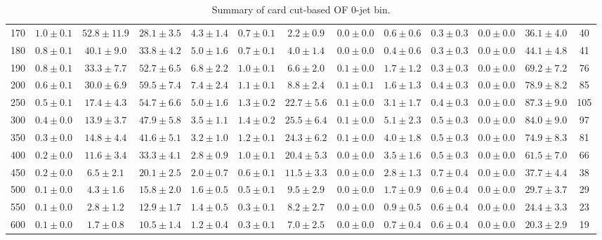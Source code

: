 \begin{table}
{\begin{center}
\begin{tabular}{l | c c | c c c c c c c c  | c c}
170 & $1.0\pm0.1$ & $52.8\pm11.9$ & $28.1\pm3.5$ & $4.3\pm1.4$ & $0.7\pm0.1$ & $2.2\pm0.9$ & $0.0\pm0.0$ & $0.6\pm0.6$ & $0.3\pm0.3$ & $0.0\pm0.0$ & $36.1\pm4.0$ & 40 \\
180 & $0.8\pm0.1$ & $40.1\pm9.0$ & $33.8\pm4.2$ & $5.0\pm1.6$ & $0.7\pm0.1$ & $4.0\pm1.4$ & $0.0\pm0.0$ & $0.4\pm0.6$ & $0.3\pm0.3$ & $0.0\pm0.0$ & $44.1\pm4.8$ & 41 \\
190 & $0.8\pm0.1$ & $33.3\pm7.7$ & $52.7\pm6.5$ & $6.8\pm2.2$ & $1.0\pm0.1$ & $6.6\pm2.0$ & $0.1\pm0.0$ & $1.7\pm1.2$ & $0.3\pm0.3$ & $0.0\pm0.0$ & $69.2\pm7.2$ & 76 \\
200 & $0.6\pm0.1$ & $30.0\pm6.9$ & $59.5\pm7.4$ & $7.4\pm2.4$ & $1.1\pm0.1$ & $8.8\pm2.4$ & $0.1\pm0.1$ & $1.6\pm1.3$ & $0.4\pm0.3$ & $0.0\pm0.0$ & $78.9\pm8.2$ & 85 \\
250 & $0.5\pm0.1$ & $17.4\pm4.3$ & $54.7\pm6.6$ & $5.0\pm1.6$ & $1.3\pm0.2$ & $22.7\pm5.6$ & $0.1\pm0.0$ & $3.1\pm1.7$ & $0.4\pm0.3$ & $0.0\pm0.0$ & $87.3\pm9.0$ & 105 \\
300 & $0.4\pm0.0$ & $13.9\pm3.7$ & $47.9\pm5.8$ & $3.5\pm1.1$ & $1.4\pm0.2$ & $25.5\pm6.4$ & $0.1\pm0.0$ & $5.1\pm2.3$ & $0.5\pm0.3$ & $0.0\pm0.0$ & $84.0\pm9.0$ & 97 \\
350 & $0.3\pm0.0$ & $14.8\pm4.4$ & $41.6\pm5.1$ & $3.2\pm1.0$ & $1.2\pm0.1$ & $24.3\pm6.2$ & $0.1\pm0.0$ & $4.0\pm1.8$ & $0.5\pm0.3$ & $0.0\pm0.0$ & $74.9\pm8.3$ & 81 \\
400 & $0.2\pm0.0$ & $11.6\pm3.4$ & $33.3\pm4.1$ & $2.8\pm0.9$ & $1.0\pm0.1$ & $20.4\pm5.3$ & $0.0\pm0.0$ & $3.5\pm1.6$ & $0.5\pm0.3$ & $0.0\pm0.0$ & $61.5\pm7.0$ & 66 \\
450 & $0.2\pm0.0$ & $6.5\pm2.1$ & $20.1\pm2.5$ & $2.0\pm0.7$ & $0.6\pm0.1$ & $11.5\pm3.3$ & $0.0\pm0.0$ & $2.8\pm1.3$ & $0.7\pm0.4$ & $0.0\pm0.0$ & $37.7\pm4.4$ & 38 \\
500 & $0.1\pm0.0$ & $4.3\pm1.6$ & $15.8\pm2.0$ & $1.6\pm0.5$ & $0.5\pm0.1$ & $9.5\pm2.9$ & $0.0\pm0.0$ & $1.7\pm0.9$ & $0.6\pm0.4$ & $0.0\pm0.0$ & $29.7\pm3.7$ & 29 \\
550 & $0.1\pm0.0$ & $2.8\pm1.2$ & $12.9\pm1.7$ & $1.4\pm0.5$ & $0.3\pm0.1$ & $8.2\pm2.7$ & $0.0\pm0.0$ & $0.9\pm0.5$ & $0.6\pm0.4$ & $0.0\pm0.0$ & $24.4\pm3.3$ & 23 \\
600 & $0.1\pm0.0$ & $1.7\pm0.8$ & $10.5\pm1.4$ & $1.2\pm0.4$ & $0.3\pm0.1$ & $7.0\pm2.5$ & $0.0\pm0.0$ & $0.7\pm0.4$ & $0.6\pm0.4$ & $0.0\pm0.0$ & $20.3\pm2.9$ & 19 \\
\hline
\end{tabular}
\end{center}
}
\caption{Summary of card cut-based OF 0-jet bin.}
\end{table}
